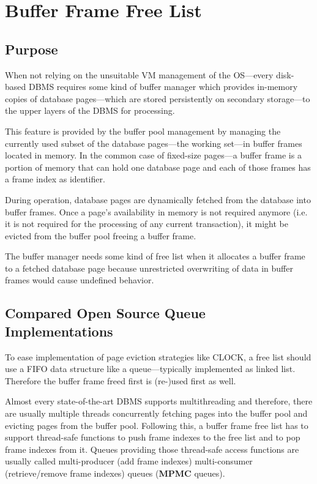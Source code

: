 \chapter[Buffer Frame Free List]{Buffer Frame Free List} \label{ch:free-list}

\section[Purpose]{Purpose}

	When not relying on the unsuitable VM management of the OS---every disk-based DBMS requires some kind of buffer manager which provides in-memory copies of database pages---which are stored persistently on secondary storage---to the upper layers of the DBMS for processing.
	
	This feature is provided by the buffer pool management by managing the currently used subset of the database pages---the working set---in buffer frames located in memory. In the common case of fixed-size pages---a buffer frame is a portion of memory that can hold one database page and each of those frames has a frame index as identifier.
	
	During operation, database pages are dynamically fetched from the database into buffer frames. Once a page's availability in memory is not required anymore (i.e. it is not required for the processing of any current transaction), it might be evicted from the buffer pool freeing a buffer frame.
	
	The buffer manager needs some kind of free list when it allocates a buffer frame to a fetched database page because unrestricted overwriting of data in buffer frames would cause undefined behavior.

\section[Compared Open Source Queue Implementations]{Compared Open Source Queue Implementations}

	To ease implementation of page eviction strategies like CLOCK, a free list should use a FIFO data structure like a queue---typically implemented as linked list. Therefore the buffer frame freed first is (re-)used first as well.
	
	Almost every state-of-the-art DBMS supports multithreading and therefore, there are usually multiple threads concurrently fetching pages into the buffer pool and evicting pages from the buffer pool. Following this, a buffer frame free list has to support thread-safe functions to push frame indexes to the free list and to pop frame indexes from it. Queues providing those thread-safe access functions are usually called multi-producer (add frame indexes) multi-consumer (retrieve/remove frame indexes) queues (\textbf{MPMC} queues).
	
